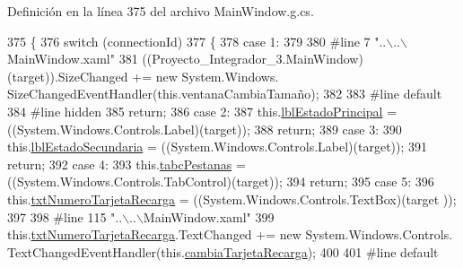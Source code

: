 Definición en la línea 375 del archivo Main\-Window.\-g.\-cs.


\begin{DoxyCode}
375                                                                                                 \{
376             \textcolor{keywordflow}{switch} (connectionId)
377             \{
378             \textcolor{keywordflow}{case} 1:
379             
380 \textcolor{preprocessor}{            #line 7 "..\(\backslash\)..\(\backslash\)MainWindow.xaml"}
381 \textcolor{preprocessor}{}            ((Proyecto\_Integrador\_3.MainWindow)(target)).SizeChanged += \textcolor{keyword}{new} System.Windows.
      SizeChangedEventHandler(\textcolor{keyword}{this}.ventanaCambiaTamaño);
382             
383 \textcolor{preprocessor}{            #line default}
384 \textcolor{preprocessor}{}\textcolor{preprocessor}{            #line hidden}
385 \textcolor{preprocessor}{}            \textcolor{keywordflow}{return};
386             \textcolor{keywordflow}{case} 2:
387             this.\hyperlink{class_proyecto___integrador__3_1_1_main_window_a3120ba863f838314aeed5764404c80d5}{lblEstadoPrincipal} = ((System.Windows.Controls.Label)(target));
388             \textcolor{keywordflow}{return};
389             \textcolor{keywordflow}{case} 3:
390             this.\hyperlink{class_proyecto___integrador__3_1_1_main_window_ab3c46fae3b8ee53389013b8cc0426f77}{lblEstadoSecundaria} = ((System.Windows.Controls.Label)(target));
391             \textcolor{keywordflow}{return};
392             \textcolor{keywordflow}{case} 4:
393             this.\hyperlink{class_proyecto___integrador__3_1_1_main_window_a46bffd3bc6bf702252e6568b9c00f35c}{tabcPestanas} = ((System.Windows.Controls.TabControl)(target));
394             \textcolor{keywordflow}{return};
395             \textcolor{keywordflow}{case} 5:
396             this.\hyperlink{class_proyecto___integrador__3_1_1_main_window_a921e64f5a9f1531f12802b32f06bf71b}{txtNumeroTarjetaRecarga} = ((System.Windows.Controls.TextBox)(target
      ));
397             
398 \textcolor{preprocessor}{            #line 115 "..\(\backslash\)..\(\backslash\)MainWindow.xaml"}
399 \textcolor{preprocessor}{}            this.\hyperlink{class_proyecto___integrador__3_1_1_main_window_a921e64f5a9f1531f12802b32f06bf71b}{txtNumeroTarjetaRecarga}.TextChanged += \textcolor{keyword}{new} System.Windows.Controls.
      TextChangedEventHandler(this.\hyperlink{class_proyecto___integrador__3_1_1_main_window_ae62fbb5bc9da0f805d207465ef0ac41a}{cambiaTarjetaRecarga});
400             
401 \textcolor{preprocessor}{            #line default}

\end{DoxyCode}
